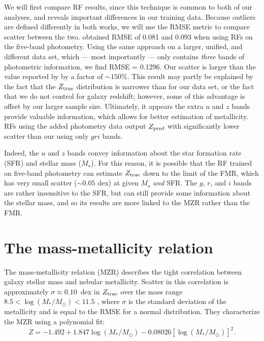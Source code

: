 \documentclass[fleqn,usenatbib]{mnras}
\begin{document}
We will first compare RF results, since this technique is common to both of our analyses, and reveals important differences in our training data.
Because outliers are defined differently in both works, we will use the RMSE metric to compare scatter between the two.
\cite{2016MNRAS.456.1618A} obtained RMSE of 0.081 and 0.093 when using RFs on the five-band photometry.
Using the same approach on a larger, unified, and different data set, which --- most importantly --- only contains \textit{three} bands of photometric information, we find RMSE = 0.1296.
Our scatter is larger than the value reported by \cite{2016MNRAS.456.1618A} by a factor of $\sim 150\%$.
This result may partly be explained by the fact that the $Z_{\rm true}$ distribution is narrower than for our data set, or the fact that we do not control for galaxy redshift; however, some of this advantage is offset by our larger sample size.
Ultimately, it appears the extra $u$ and $z$ bands provide valuable information, which allows for better estimation of metallicity.
RFs using the added photometry data output $Z_{\rm pred}$ with significantly lower scatter than our using only $gri$ bands.

Indeed, the $u$ and $z$ bands convey information about the star formation rate (SFR) and stellar mass ($M_\star$).
For this reason, it is possible that the RF trained on five-band photometry can estimate $Z_{\rm true}$ down to the limit of the FMR, which has very small scatter ($\sim 0.05$ dex) at given $M_{\star}$ \textit{and} SFR.
The $g$, $r$, and $i$ bands are rather insensitive to the SFR, but can still provide some information about the stellar mass, and so its results are more linked to the MZR rather than the FMR.



\section{The mass-metallicity relation} \label{sec:MMR}

The mass-metallicity relation (MZR) describes the tight correlation between galaxy stellar mass and nebular metallicity.
Scatter in this correlation is approximately $\sigma \approx 0.10$~dex in $Z_{\rm true}$ over the mass range $8.5 < \log (M_\ast / M_\odot) < 11.5$ \citep{2004ApJ...613..898T}, where $\sigma$ is the standard deviation of the metallicity and is equal to the RMSE for a normal distribution.
They characterize the MZR using a polynomial fit:
\begin{equation}\label{eq:mzr}
Z = -1.492 + 1.847 \log (M_\ast / M_\odot) - 0.08026 \left [\log(M_\ast / M_\odot)\right ]^2.
\end{equation}
\end{document}
